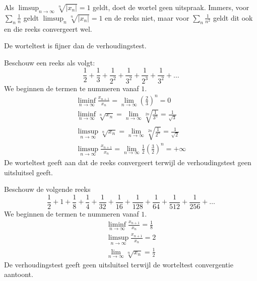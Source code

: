 \documentclass[main.tex]{subfiles}
\begin{document}
\begin{opm}
  Als $\limsup_{n\rightarrow \infty}\sqrt[n]{|x_{n}|}= 1$ geldt, doet de wortel geen uitspraak.
  Immers, voor $\sum_{n}\frac{1}{n}$ geldt $\limsup_{n}\sqrt[n]{|x_{n}|} = 1$ en de reeks niet, maar voor $\sum_{n}\frac{1}{n^{2}}$ geldt dit ook en die reeks convergeert wel.
\end{opm}

\begin{st}
  De worteltest is fijner dan de verhoudingstest.
\end{st}

\begin{vb}
  Beschouw een reeks als volgt:
  \[ \frac{1}{2} + \frac{1}{3} + \frac{1}{2^{2}} + \frac{1}{3^{2}} + \frac{1}{2^{3}} + \frac{1}{3^{2}} + \dotsc \]
  We beginnen de termen te nummeren vanaf $1$.
  \begin{align*}
    \liminf_{n\rightarrow \infty}\frac{x_{n+1}}{x_{n}} = \lim_{n \rightarrow \infty}\left(\frac{2}{3}\right)^{n} = 0\\
    \liminf_{n\rightarrow \infty}\sqrt[n]{x_{n}} = \lim_{n \rightarrow \infty}\sqrt[2n]{\frac{1}{3^{n}}} = \frac{1}{\sqrt{3}}\\
    \limsup_{n\rightarrow \infty}\sqrt[n]{x_{n}} = \lim_{n\rightarrow \infty}\sqrt[2n]{\frac{1}{2^{n}}} = \frac{1}{\sqrt{2}}\\
    \limsup_{n\rightarrow \infty}\frac{x_{n+1}}{x_{n}} = \lim_{n\rightarrow \infty}\frac{1}{2}\left(\frac{3}{2}\right)^{n} = +\infty
  \end{align*}
  De worteltest geeft aan dat de reeks convergeert terwijl de verhoudingstest geen uitsluitsel geeft.
\end{vb}

\begin{vb}
  Beschouw de volgende reeks
  \[ \frac{1}{2} + 1 + \frac{1}{8} + \frac{1}{4} + \frac{1}{32} + \frac{1}{16} + \frac{1}{128} + \frac{1}{64} + \frac{1}{512} + \frac{1}{256} + \dotsc \]
  We beginnen de termen te nummeren vanaf $1$.
  \begin{align*}
    \liminf_{n\rightarrow\infty}\frac{x_{n+1}}{x_{n}}=\frac{1}{8}\\
    \limsup_{n\rightarrow\infty}\frac{x_{n+1}}{x_{n}}=2\\
    \lim_{n\rightarrow\infty}\sqrt[n]{x_{n}} = \frac{1}{2}
  \end{align*}
  De verhoudingstest geeft geen uitsluitsel terwijl de worteltest convergentie aantoont.
\end{vb}
\end{document}
